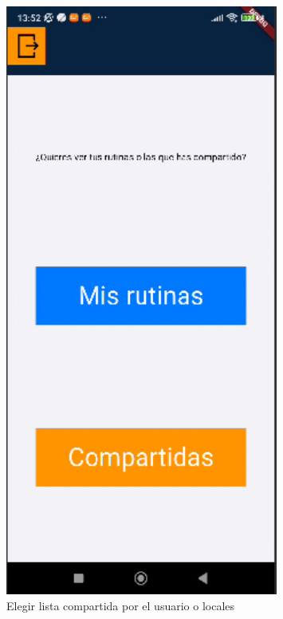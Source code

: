 \begin{figure}[H]
   \centering
    \includegraphics[width=0.8\textwidth]{pantallas/rutinaMiaOComp.png}
    \caption{Elegir lista compartida por el usuario o locales}
    \label{fig:rutinaMiaOComp}
\end{figure}

